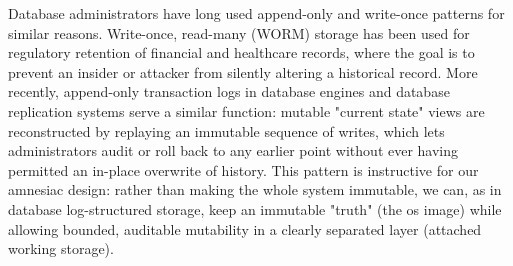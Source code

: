 Database administrators have long used append-only and write-once patterns for similar reasons.  Write-once, read-many (WORM) storage has been used for regulatory retention of financial and healthcare records, where the goal is to prevent an insider or attacker from silently altering a historical record.  More recently, append-only transaction logs in database engines and \gls{database} replication systems serve a similar function: mutable "current state" views are reconstructed by replaying an immutable sequence of writes, which lets administrators audit or roll back to any earlier point without ever having permitted an in-place overwrite of history.  This pattern is instructive for our \gls{amnesiac} design: rather than making the whole system immutable, we can, as in database log-structured storage, keep an immutable "truth" (the \gls{os} image) while allowing bounded, auditable mutability in a clearly separated layer (attached working storage).

